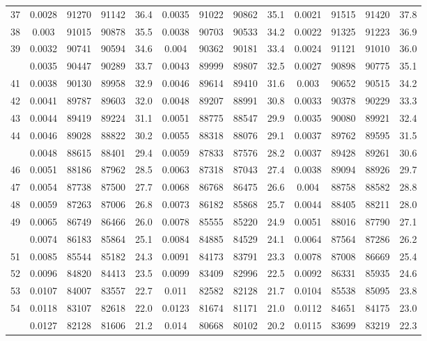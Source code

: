 \documentclass[
  14pt,
]{article}
\begin{document}
\begin{longtable}[t]{lcccccccccccc}
37 & 0.0028 & 91270 & 91142 & 36.4 & 0.0035 & 91022 & 90862 & 35.1 & 0.0021 & 91515 & 91420 & 37.8\\
38 & 0.003 & 91015 & 90878 & 35.5 & 0.0038 & 90703 & 90533 & 34.2 & 0.0022 & 91325 & 91223 & 36.9\\
39 & 0.0032 & 90741 & 90594 & 34.6 & 0.004 & 90362 & 90181 & 33.4 & 0.0024 & 91121 & 91010 & 36.0\\
\addlinespace
40 & 0.0035 & 90447 & 90289 & 33.7 & 0.0043 & 89999 & 89807 & 32.5 & 0.0027 & 90898 & 90775 & 35.1\\
41 & 0.0038 & 90130 & 89958 & 32.9 & 0.0046 & 89614 & 89410 & 31.6 & 0.003 & 90652 & 90515 & 34.2\\
42 & 0.0041 & 89787 & 89603 & 32.0 & 0.0048 & 89207 & 88991 & 30.8 & 0.0033 & 90378 & 90229 & 33.3\\
43 & 0.0044 & 89419 & 89224 & 31.1 & 0.0051 & 88775 & 88547 & 29.9 & 0.0035 & 90080 & 89921 & 32.4\\
44 & 0.0046 & 89028 & 88822 & 30.2 & 0.0055 & 88318 & 88076 & 29.1 & 0.0037 & 89762 & 89595 & 31.5\\
\addlinespace
45 & 0.0048 & 88615 & 88401 & 29.4 & 0.0059 & 87833 & 87576 & 28.2 & 0.0037 & 89428 & 89261 & 30.6\\
46 & 0.0051 & 88186 & 87962 & 28.5 & 0.0063 & 87318 & 87043 & 27.4 & 0.0038 & 89094 & 88926 & 29.7\\
47 & 0.0054 & 87738 & 87500 & 27.7 & 0.0068 & 86768 & 86475 & 26.6 & 0.004 & 88758 & 88582 & 28.8\\
48 & 0.0059 & 87263 & 87006 & 26.8 & 0.0073 & 86182 & 85868 & 25.7 & 0.0044 & 88405 & 88211 & 28.0\\
49 & 0.0065 & 86749 & 86466 & 26.0 & 0.0078 & 85555 & 85220 & 24.9 & 0.0051 & 88016 & 87790 & 27.1\\
\addlinespace
50 & 0.0074 & 86183 & 85864 & 25.1 & 0.0084 & 84885 & 84529 & 24.1 & 0.0064 & 87564 & 87286 & 26.2\\
51 & 0.0085 & 85544 & 85182 & 24.3 & 0.0091 & 84173 & 83791 & 23.3 & 0.0078 & 87008 & 86669 & 25.4\\
52 & 0.0096 & 84820 & 84413 & 23.5 & 0.0099 & 83409 & 82996 & 22.5 & 0.0092 & 86331 & 85935 & 24.6\\
53 & 0.0107 & 84007 & 83557 & 22.7 & 0.011 & 82582 & 82128 & 21.7 & 0.0104 & 85538 & 85095 & 23.8\\
54 & 0.0118 & 83107 & 82618 & 22.0 & 0.0123 & 81674 & 81171 & 21.0 & 0.0112 & 84651 & 84175 & 23.0\\
\addlinespace
55 & 0.0127 & 82128 & 81606 & 21.2 & 0.014 & 80668 & 80102 & 20.2 & 0.0115 & 83699 & 83219 & 22.3\\

\end{longtable}
\end{document}
